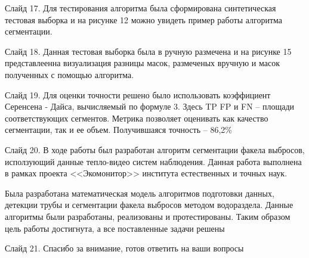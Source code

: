 \documentclass[14pt, a4paper]{extreport}
\begin{document}
	Слайд 17. Для тестирования алгоритма была сформирована синтетическая тестовая выборка и на рисунке 12 можно увидеть пример работы алгоритма сегментации.
	
	Слайд 18. Данная тестовая выборка была в ручную размечена и на рисунке 15 представлеенна визуализация разницы масок, размеченых вручную и масок полученных с помощью алгоритма. 
	
	Слайд 19. Для оценки точности решено было использовать коэффициент Серенсена - Дайса, вычисляемый по формуле 3. Здесь TP FP и FN -- площади соответствующих сегментов. Метрика позволяет оценивать как качество сегментации, так и ее объем. Получившаяся точность -- 86,2\%
	
	Слайд 20. В ходе работы был разработан алгоритм сегментации факела выбросов, исползующий данные тепло-видео систем наблюдения. Данная работа выполнена в рамках проекта <<Экомонитор>> института естественных и точных наук.
	
	Была разработана математическая модель алгоритмов подготовки данных, детекции трубы и сегментации факела выбросов методом водораздела. Данные алгоритмы были разработаны, реализованы и протестированы. Таким образом цель работы достигнута, а все поставленные задачи решены
	
	Слайд 21. Спасибо за внимание, готов ответить на ваши вопросы
	
	
\end{document}
